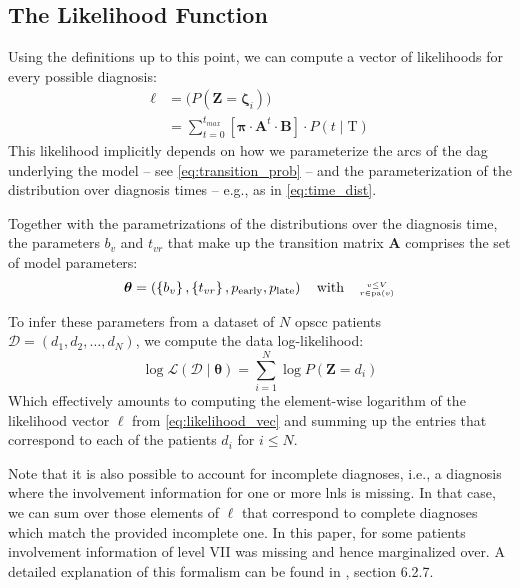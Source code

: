 \documentclass[twocolumn]{aastex631}
\begin{document}
\subsection{The Likelihood Function}
\label{subsec:formalism:likelihood}

Using the definitions up to this point, we can compute a vector of likelihoods for every possible diagnosis:
%
\begin{equation} \label{eq:likelihood_vec}
\begin{split}
    \boldsymbol{\ell} &= \big( P\left( \mathbf{Z} = \boldsymbol{\zeta}_i \right) \big) \\
    &= \sum_{t=0}^{t_{max}} \left[ \boldsymbol{\pi} \cdot \mathbf{A}^t \cdot \mathbf{B} \right] \cdot P \left( t \mid \text{T} \right)
\end{split}
\end{equation}
%
This likelihood implicitly depends on how we parameterize the arcs of the \gls{dag} underlying the model -- see \autoref{eq:transition_prob} -- and the parameterization of the distribution over diagnosis times -- e.g., as in \autoref{eq:time_dist}. 

Together with the parametrizations of the distributions over the diagnosis time, the parameters $b_v$ and $t_{vr}$ that make up the transition matrix $\mathbf{A}$ comprises the set of model parameters:
%
\begin{equation}
    \boldsymbol{\theta} = \left( \left\{ b_v \right\}, \left\{ t_{vr} \right\}, p_\text{early}, p_\text{late} \right) \quad \text{with} \quad \genfrac{}{}{0pt}{2}{v\leq V}{r\in\operatorname{pa}(v)}
\end{equation}

To infer these parameters from a dataset of $N$ \gls{opscc} patients $\boldsymbol{\mathcal{D}} = \left( d_1, d_2, \ldots, d_N \right)$, we compute the data log-likelihood:
%
\begin{equation} \label{eq:log_likelihood}
    \log\mathcal{L} \left( \boldsymbol{\mathcal{D}} \mid \boldsymbol{\theta} \right) = \sum_{i=1}^N \log P \left( \mathbf{Z} = d_i \right)
\end{equation}
%
Which effectively amounts to computing the element-wise logarithm of the likelihood vector $\boldsymbol{\ell}$ from \autoref{eq:likelihood_vec} and summing up the entries that correspond to each of the patients $d_i$ for $i\leq N$.

Note that it is also possible to account for incomplete diagnoses, i.e., a diagnosis where the involvement information for one or more \glspl{lnl} is missing. In that case, we can sum over those elements of $\boldsymbol{\ell}$ that correspond to complete diagnoses which match the provided incomplete one. In this paper, for some patients involvement information of level VII was missing and hence marginalized over. A detailed explanation of this formalism can be found in \citep{zora231470}, section 6.2.7.
\end{document}
